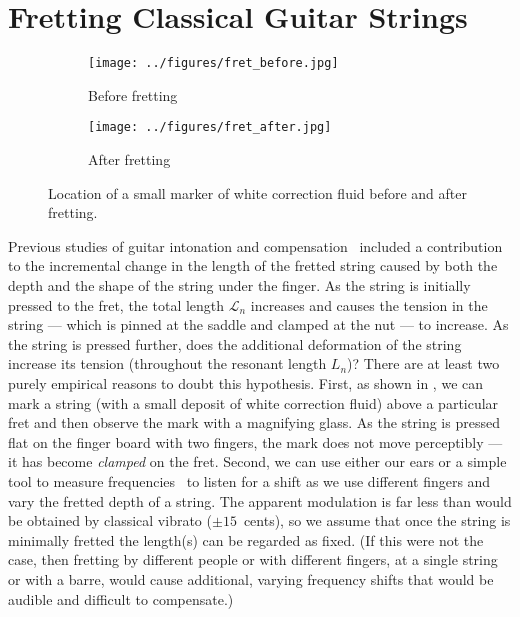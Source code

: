 %
%
%

 \section{Fretting Classical Guitar Strings\label{app:fret}}

\begin{figure}
    \centering
    \begin{subfigure}[b]{0.45\textwidth}
        \centering
        \texttt{[image: ../figures/fret\_before.jpg]}
        \caption{Before fretting}
        \label{fig:fret_before}
    \end{subfigure}
    \hspace{0.25in}
    \begin{subfigure}[b]{0.45\textwidth}
        \centering
        \texttt{[image: ../figures/fret\_after.jpg]}
        \caption{After fretting}
        \label{fig:fret_after}
    \end{subfigure}
    \caption{\label{fig:fret_befaft} Location of a small marker of white correction fluid before and after fretting.}
  \end{figure}
  
Previous studies of guitar intonation and compensation~\cite{ref:byers1996cgi,ref:varieschi2010icf} included a contribution to the incremental change in the length of the fretted string caused by both the depth and the shape of the string under the finger. As the string is initially pressed to the fret, the total length $\mathcal{L}_n$ increases and causes the tension in the string --- which is pinned at the saddle and clamped at the nut --- to increase. As the string is pressed further, does the additional deformation of the string increase its tension (throughout the resonant length $L_n$)? There are at least two purely empirical reasons to doubt this hypothesis. First, as shown in , we can mark a string (with a small deposit of white correction fluid) above a particular fret and then observe the mark with a magnifying glass. As the string is pressed flat on the finger board with two fingers, the mark does not move perceptibly --- it has become \emph{clamped} on the fret. Second, we can use either our ears or a simple tool to measure frequencies~\cite{ref:pgtweb} to listen for a shift as we use different fingers and vary the fretted depth of a string. The apparent modulation is far less than would be obtained by classical vibrato ($\pm15$~cents), so we assume that once the string is minimally fretted the length(s) can be regarded as fixed. (If this were not the case, then fretting by different people or with different fingers, at a single string or with a barre, would cause additional, varying frequency shifts that would be audible and difficult to compensate.)


